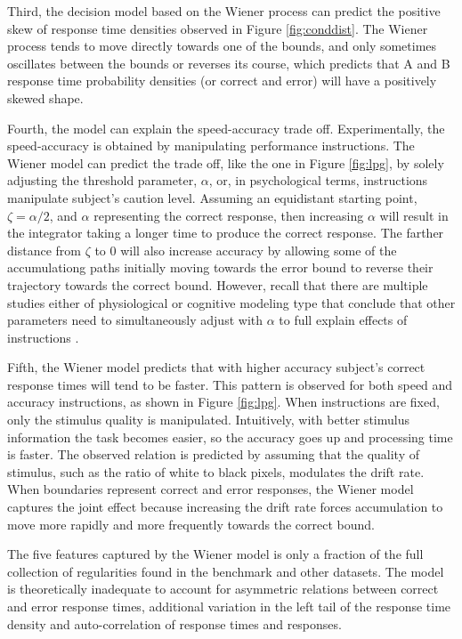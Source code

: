 \documentclass[12pt]{report}
\begin{document}
Third, the decision model based on the Wiener process can predict the positive skew of response time densities observed in Figure \ref{fig:conddist}. The Wiener process tends to move directly towards one of the bounds, and only sometimes oscillates between the bounds or reverses its course, which predicts that A and B response time probability densities (or correct and error) will have a positively skewed shape.

Fourth, the model can explain the speed-accuracy trade off. Experimentally, the speed-accuracy is obtained by manipulating performance instructions. The Wiener model can predict the trade off, like the one in Figure \ref{fig:lpg}, by solely adjusting the threshold parameter, $\alpha$, or, in psychological terms, instructions manipulate subject's caution level. Assuming an equidistant starting point, $\zeta = \alpha /2$, and $\alpha$ representing the correct response, then increasing $\alpha$ will result in the integrator taking a longer time to produce the correct response. The farther distance from $\zeta$ to 0 will also increase accuracy by allowing some of the accumulationg paths initially moving towards the error bound to reverse their trajectory towards the correct bound. However, recall that there are multiple studies either of physiological or cognitive modeling type that conclude that other parameters need to simultaneously adjust with $\alpha$ to full explain effects of instructions \citep{RinOsm2004,VanTue2011,RaeHea2014}. 

Fifth, the Wiener model predicts that with higher accuracy subject's correct response times will tend to be faster. 
This pattern is observed for both  speed and accuracy instructions, as shown in Figure \ref{fig:lpg}. When instructions are fixed, only the stimulus quality is manipulated. Intuitively, with better stimulus information the task becomes easier, so the accuracy goes up and processing time is faster. The observed relation is predicted by assuming that the quality of stimulus, such as the ratio of white to black pixels, modulates the drift rate. When boundaries represent correct and error responses, the Wiener model captures the joint effect because increasing the drift rate forces accumulation to move more rapidly and more frequently towards the correct bound. 

The five features captured by the Wiener model is only a fraction of the full collection of regularities found in the benchmark and other datasets. The model is theoretically inadequate to account for asymmetric relations between correct and error response times, additional variation in the left tail of the response time density and auto-correlation of response times and responses. 
    
\end{document}
